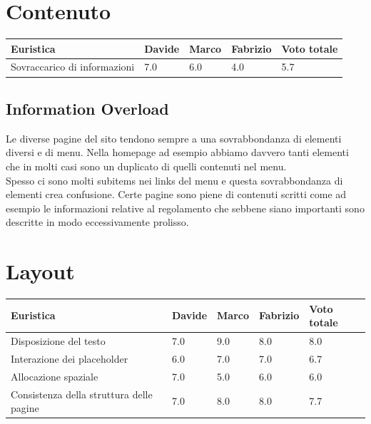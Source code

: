     \section{Contenuto}
    \begin{table}[H]
        \begin{tabular}{|l|l|l|l|l|}
        \hline \textbf{Euristica} & \textbf{Davide} & \textbf{Marco} & \textbf{Fabrizio} & \textbf{Voto totale} \\ \hline
        Sovraccarico di informazioni & 7.0 & 6.0 & 4.0 & 5.7 \\ \hline
        \end{tabular}
        \end{table}
        \subsection{Information Overload}
        Le diverse pagine del sito tendono sempre a una sovrabbondanza di
        elementi diversi e di menu. 
        Nella homepage ad esempio abbiamo davvero tanti elementi che in molti casi
        sono un duplicato di quelli contenuti nel menu.\\ Spesso ci sono molti
        subitems nei links del menu e questa sovrabbondanza di elementi crea confusione.
        Certe pagine sono piene di contenuti scritti come ad esempio le informazioni relative al regolamento che sebbene siano importanti sono
        descritte in modo eccessivamente prolisso.


    \section{Layout}
        \begin{table}[H]
        \begin{tabular}{|l|l|l|l|l|}
        \hline \textbf{Euristica} & \textbf{Davide} & \textbf{Marco} & \textbf{Fabrizio} & \textbf{Voto totale} \\ \hline
        Disposizione del testo & 7.0 & 9.0 & 8.0 & 8.0 \\ \hline
        Interazione dei placeholder & 6.0 & 7.0 & 7.0 & 6.7 \\ \hline
        Allocazione spaziale & 7.0 & 5.0 & 6.0 & 6.0 \\ \hline
        Consistenza della struttura delle pagine & 7.0 & 8.0 & 8.0 & 7.7 \\ \hline
        \end{tabular}
        \end{table}

